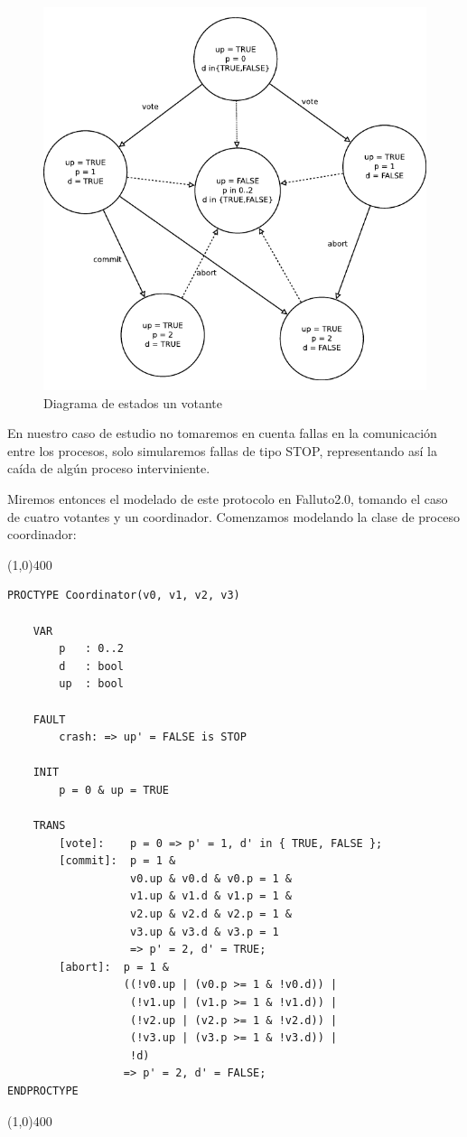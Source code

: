 \documentclass[pdftex,a4paper,12pt]{book}
\begin{document}
\begin{figure}[htp]
  \centering
    \includegraphics{Imagenes/2pcVoter.pdf}
  \caption{Diagrama de estados un votante}
  \label{2pcv}
\end{figure}


En nuestro caso de estudio no tomaremos en cuenta fallas en la comunicaci\'on entre los procesos, solo simularemos fallas de tipo STOP, representando as\'i la ca\'ida de alg\'un proceso interviniente.

Miremos entonces el modelado de este protocolo en Falluto2.0, tomando el caso de cuatro votantes y un coordinador. Comenzamos modelando la clase de proceso coordinador:

\noindent \line(1,0){400}
\begin{verbatim}
PROCTYPE Coordinator(v0, v1, v2, v3)

    VAR
        p   : 0..2
        d   : bool
        up  : bool
    
    FAULT 
        crash: => up' = FALSE is STOP

    INIT
        p = 0 & up = TRUE

    TRANS
        [vote]:    p = 0 => p' = 1, d' in { TRUE, FALSE };
        [commit]:  p = 1 &
                   v0.up & v0.d & v0.p = 1 &
                   v1.up & v1.d & v1.p = 1 &
                   v2.up & v2.d & v2.p = 1 &
                   v3.up & v3.d & v3.p = 1 
                   => p' = 2, d' = TRUE;
        [abort]:  p = 1 &
                  ((!v0.up | (v0.p >= 1 & !v0.d)) |
                   (!v1.up | (v1.p >= 1 & !v1.d)) |
                   (!v2.up | (v2.p >= 1 & !v2.d)) |
                   (!v3.up | (v3.p >= 1 & !v3.d)) |
                   !d)
                  => p' = 2, d' = FALSE;
ENDPROCTYPE
\end{verbatim}
\line(1,0){400}
~\\
\end{document}

